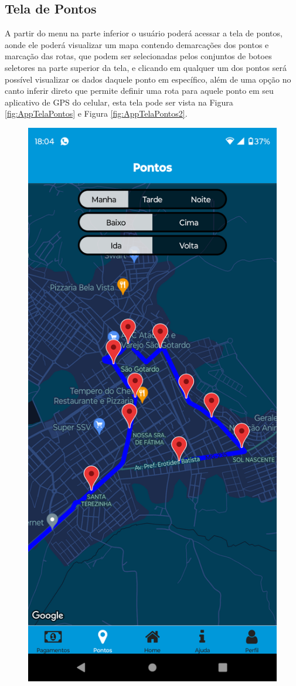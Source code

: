 \documentclass[
    12pt,                   %
    openright,              %
    oneside,                %
    a4paper,                %
    sumario=tradicional,    %
    english,                %
    brazil,                 %
    ]{abntex2}
\begin{document}
            \newpage
        \subsection{Tela de Pontos}
            A partir do menu na parte inferior o usuário poderá acessar a tela de pontos, aonde ele poderá visualizar um mapa contendo demarcações dos pontos e marcação das rotas, que podem ser selecionadas pelos conjuntos de botoes seletores na parte superior da tela, e clicando em qualquer um dos pontos será possível visualizar os dados daquele ponto em específico, além de uma opção no canto inferir direto que permite definir uma rota para aquele ponto em seu aplicativo de GPS do celular, esta tela pode ser vista na Figura \ref{fig:AppTelaPontos} e Figura \ref{fig:AppTelaPontos2}.

            \begin{figure}[!h]          
                \begin{minipage}{0.5\textwidth}
                    \centering
                    \includegraphics[width=0.8\linewidth]{Imagens/App Images User/AUPontos1.png}

\end{minipage}
\end{figure}
\end{document}
